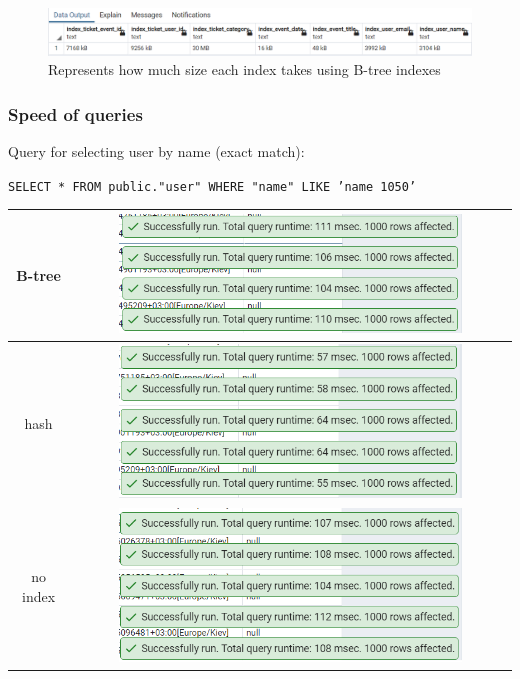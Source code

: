 \begin{figure}[h]
    \centering
    \label{fig:b_tree_index_size}
    \includegraphics[width=1\textwidth]{images/index_size_b_tree}
    \caption{Represents how much size each index takes using B-tree indexes}
\end{figure}

\subsubsection{Speed of queries}

Query for selecting user by name (exact match):

\texttt{SELECT * FROM public."user" WHERE "name" LIKE 'name 1050'}

\begin{center}
    \begin{tabular}{ | c | c |}
        \hline
        B-tree   & \includegraphics[width=0.8\textwidth]{images/query_select_user_by_email_like_performance_b_tree}   \\ \hline
        hash     & \includegraphics[width=0.8\textwidth]{images/query_select_user_by_email_like_performance_hash}     \\ \hline
        no index & \includegraphics[width=0.8\textwidth]{images/query_select_user_by_email_like_performance_no_index} \\ \hline
    \end{tabular}
\end{center}

